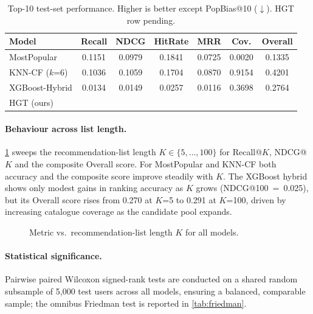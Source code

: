 \begin{table}[t]
\centering
\caption{Top-10 test-set performance. Higher is better except
PopBias@10 ($\downarrow$). HGT row pending.}
\label{tab:main-results}
\footnotesize
\setlength{\tabcolsep}{3.5pt}
\begin{tabular}{l S[table-format=1.4] S[table-format=1.4] S[table-format=1.4] S[table-format=1.4] S[table-format=1.4] S[table-format=1.4]}
\toprule
\textbf{Model} & {Recall} & {NDCG} & {HitRate} & {MRR} & {Cov.} & {Overall} \\
\midrule
MostPopular           & 0.1151 & 0.0979 & 0.1841 & 0.0725 & 0.0020 & 0.1335 \\
KNN-CF ($k$=6)        & 0.1036 & 0.1059 & 0.1704 & 0.0870 & 0.9154 & 0.4201 \\
XGBoost-Hybrid        & 0.0134 & 0.0149 & 0.0257 & 0.0116 & 0.3698 & 0.2764 \\
HGT (ours)            & \TODO{} & \TODO{} & \TODO{} & \TODO{} & \TODO{} & \TODO{} \\
\bottomrule
\end{tabular}
\end{table}

\paragraph{Behaviour across list length.}
\cref{fig:multik} sweeps the recommendation-list length $K\in\{5,\dots,100\}$
for Recall@$K$, NDCG@$K$ and the composite Overall score. For MostPopular
and KNN-CF both accuracy and the composite score improve steadily with $K$.
The XGBoost hybrid shows only modest gains in ranking accuracy as $K$ grows
(NDCG@100~=~0.025), but its Overall score rises from 0.270 at $K$=5 to 0.291
at $K$=100, driven by increasing catalogue coverage as the candidate pool
expands. 

\begin{figure}[t]
\centering
{}
\caption{Metric vs.\ recommendation-list length $K$ for all models.}
\label{fig:multik}
\end{figure}

\paragraph{Statistical significance.}
Pairwise paired Wilcoxon signed-rank tests are conducted on a shared random
subsample of 5{,}000 test users across all models, ensuring a balanced,
comparable sample; the omnibus Friedman test is reported in
\cref{tab:friedman}. 

